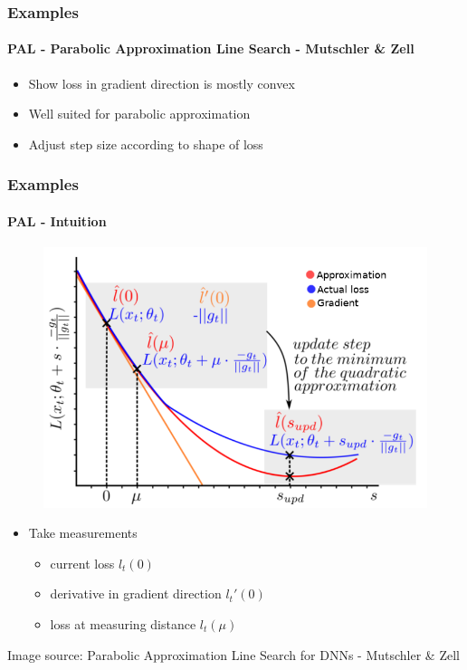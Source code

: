 \documentclass[9pt]{beamer}
\begin{document}



\begin{frame}
\frametitle{Examples}
\framesubtitle{PAL - Parabolic Approximation Line Search - Mutschler \& Zell}
\begin{itemize}%
	\item Show loss in gradient direction is mostly convex
	\item Well suited for parabolic approximation
	\item Adjust step size according to shape of loss
\end{itemize}
\end{frame} 

\begin{frame}
\frametitle{Examples}
\framesubtitle{PAL - Intuition}
\begin{figure}
	\includegraphics[width=.5\linewidth]{figures/pal_1.png}
\end{figure} 	
\begin{itemize}%
	\item Take measurements
	\begin{itemize}
		\item current loss $l_t(0)$
		\item derivative in gradient direction $l_t'(0)$
		\item loss at measuring distance $l_t(\mu)$
	\end{itemize}
	
\end{itemize}
\tiny\color{lightgray}Image source: Parabolic Approximation Line Search for DNNs - Mutschler \& Zell
\end{frame}
\end{document}
